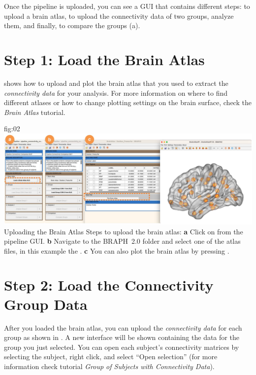 \documentclass[justified]{tufte-handout}
\begin{document}
Once the pipeline is uploaded, you can see a GUI that contains different steps: to upload a brain atlas, to upload the connectivity data of two groups, analyze them, and finally, to compare the groups (a). 

\section{Step 1: Load the Brain Atlas}
 shows how to upload and plot the brain atlas that you used to extract the \emph{connectivity data} for your analysis. For more information on where to find different atlases or how to change plotting settings on the brain surface, check the \emph{Brain Atlas} tutorial.

	{fig:02}
	{
	\includegraphics{fig02.jpg}
	}
	{Uploading the Brain Atlas}
	{
	Steps to upload the brain atlas:
	{\bf a} Click on  from the pipeline GUI.
	{\bf b} Navigate to the BRAPH~2.0 folder  and select one of the atlas files, in this example the . {\bf c} You can also plot the brain atlas by pressing . 
	}
 
\section{Step 2: Load the Connectivity Group Data}

After you loaded the brain atlas, you can upload the \emph{connectivity data} for each group as shown in . A new interface will be shown containing the data for the group you just selected. You can open each subject’s connectivity matrices by selecting the subject, right click, and select “Open selection” (for more information check tutorial \emph{Group of Subjects with Connectivity Data}).
	
\end{document}
